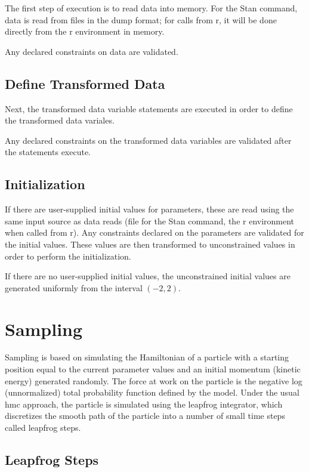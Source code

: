 \documentclass[10pt]{report}
\newcommand{\Stan}{Stan\xspace}
\newcommand{\acronym}[1]{{\sc #1}\xspace}
\newcommand{\R}{\acronym{r}}
\newcommand{\HMC}{\acronym{hmc}}
\begin{document}
The first step of execution is to read data into memory. 
For the \Stan command, data is read from files in the
dump format; for calls from \R, it will be done directly from
the \R environment in memory.

Any declared constraints on data are validated.  

\subsection{Define Transformed Data}

Next, the transformed data variable statements are executed
in order to define the transformed data variales.  

Any declared constraints on the transformed data variables are
validated after the statements execute.

\subsection{Initialization}

If there are user-supplied initial values for parameters, these are
read using the same input source as data reads (file for the \Stan
command, the \R environment when called from \R).  Any constraints
declared on the parameters are validated for the initial values.
These values are then transformed to unconstrained values in order to
perform the initialization.

If there are no user-supplied initial values, the unconstrained
initial values are generated uniformly from the interval $(-2,2)$.

\section{Sampling}

Sampling is based on simulating the Hamiltonian of a particle with a
starting position equal to the current parameter values and an initial
momentum (kinetic energy) generated randomly.  The force at work on
the particle is the negative log (unnormalized) total probability
function defined by the model.  Under the usual \HMC approach, the
particle is simulated using the leapfrog integrator, which discretizes
the smooth path of the particle into a number of small time steps called
leapfrog steps.

\subsection{Leapfrog Steps}
\end{document}

